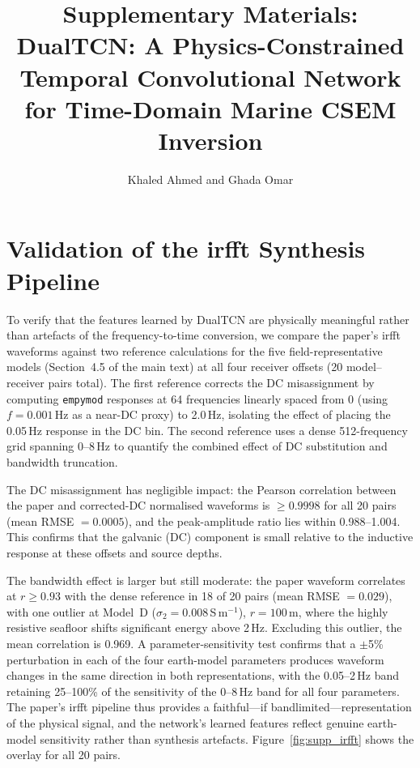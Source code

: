 \documentclass[journal]{IEEEtran}
\begin{document}
\title{Supplementary Materials:\\
DualTCN: A Physics-Constrained Temporal Convolutional Network
for Time-Domain Marine CSEM Inversion}
\author{Khaled Ahmed and Ghada Omar}
\date{}
\maketitle

\section{Validation of the irfft Synthesis Pipeline}
\label{sec:supp_irfft}

To verify that the features learned by DualTCN are physically
meaningful rather than artefacts of the frequency-to-time
conversion, we compare the paper's irfft waveforms against two
reference calculations for the five field-representative models
(Section~4.5 of the main text) at all four receiver offsets (20
model--receiver pairs total).  The first reference corrects the DC
misassignment by computing \texttt{empymod} responses at 64
frequencies linearly spaced from 0 (using $f = 0.001$\,Hz as a
near-DC proxy) to 2.0\,Hz, isolating the effect of placing the
0.05\,Hz response in the DC bin.  The second reference uses a
dense 512-frequency grid spanning 0--8\,Hz to quantify the
combined effect of DC substitution and bandwidth truncation.

The DC misassignment has negligible impact: the Pearson correlation
between the paper and corrected-DC normalised waveforms is
$\geq 0.9998$ for all 20 pairs (mean RMSE $= 0.0005$), and the
peak-amplitude ratio lies within 0.988--1.004.  This confirms that
the galvanic (DC) component is small relative to the inductive
response at these offsets and source depths.

The bandwidth effect is larger but still moderate: the paper waveform
correlates at $r \geq 0.93$ with the dense reference in 18 of 20
pairs (mean RMSE $= 0.029$), with one outlier at Model~D
($\sigma_2 = 0.008$\,S\,m$^{-1}$), $r = 100$\,m, where the highly
resistive seafloor shifts significant energy above 2\,Hz.  Excluding
this outlier, the mean correlation is 0.969.  A parameter-sensitivity
test confirms that a $\pm$5\% perturbation in each of the four
earth-model parameters produces waveform changes in the same
direction in both representations, with the 0.05--2\,Hz band
retaining 25--100\% of the sensitivity of the 0--8\,Hz band for
all four parameters.  The paper's irfft pipeline thus provides a
faithful---if bandlimited---representation of the physical signal,
and the network's learned features reflect genuine earth-model
sensitivity rather than synthesis artefacts.
Figure~\ref{fig:supp_irfft} shows the overlay for all 20 pairs.
\end{document}
